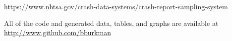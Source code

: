\documentclass[fleqn]{cas-sc}
\begin{document}
\url{https://www.nhtsa.gov/crash-data-systems/crash-report-sampling-system}

All of the code and generated data, tables, and graphs are available at 
\url{http://www.github.com/bburkman}




\begin{comment}
\begin{figure}[<options>]
	\centering
		\texttt{[image: ]}
	  \caption{}\label{fig1}
\end{figure}


\begin{table}[<options>]
\caption{}\label{tbl1}
\begin{tabular*}{\tblwidth}{@{}LL@{}}
\toprule
  &  \\ %
\midrule
 & \\
 & \\
 & \\
 & \\
\bottomrule
\end{tabular*}
\end{table}
\end{comment}





\printcredits

%




\begin{comment}
\bio{}
\endbio

\bio{pic1}
\endbio
\end{comment}
\end{document}
